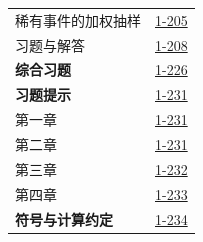 \begin{longtable}{@{}p{}r@{}}
\hspace{1em}稀有事件的加权抽样&\href{course-page:1:210}{1-205}\\[2pt]
\hspace{1em}习题与解答&\href{course-page:1:213}{1-208}\\[2pt]
\textbf{综合习题}&\href{course-page:1:231}{1-226}\\[2pt]
\textbf{习题提示}&\href{course-page:1:236}{1-231}\\[2pt]
\hspace{1em}第一章&\href{course-page:1:236}{1-231}\\[2pt]
\hspace{1em}第二章&\href{course-page:1:236}{1-231}\\[2pt]
\hspace{1em}第三章&\href{course-page:1:237}{1-232}\\[2pt]
\hspace{1em}第四章&\href{course-page:1:238}{1-233}\\[2pt]
\textbf{符号与计算约定}&\href{course-page:1:239}{1-234}\\[2pt]
\end{longtable}
